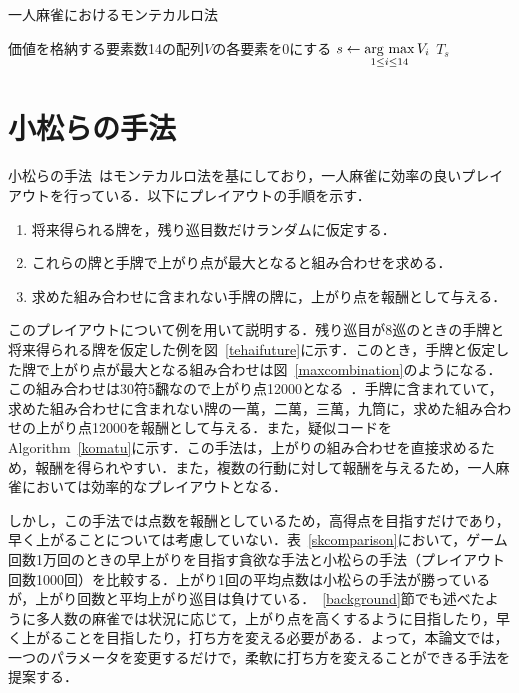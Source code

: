 \begin{algorithm}[t]
\caption{一人麻雀におけるモンテカルロ法}
\label{majangmonte}
	価値を格納する要素数14の配列$V$の各要素を0にする\;
	$s \leftarrow \mathop{\rm arg~max}\limits_{1 \le i \le 14} V_i$\;
	\Return $T_s$\;
\end{algorithm}
\clearpage

\section{小松らの手法}
小松らの手法~\cite{komatu}はモンテカルロ法を基にしており，一人麻雀に効率の良いプレイアウトを行っている．以下にプレイアウトの手順を示す．
\begin{enumerate}
\item 将来得られる牌を，残り巡目数だけランダムに仮定する．
\item これらの牌と手牌で上がり点が最大となると組み合わせを求める．
\item 求めた組み合わせに含まれない手牌の牌に，上がり点を報酬として与える．
\end{enumerate}
このプレイアウトについて例を用いて説明する．残り巡目が8巡のときの手牌と将来得られる牌を仮定した例を図~\ref{tehaifuture}に示す．このとき，手牌と仮定した牌で上がり点が最大となる組み合わせは図~\ref{maxcombination}のようになる．この組み合わせは30符5飜なので上がり点12000となる~\cite{point}．手牌に含まれていて，求めた組み合わせに含まれない牌の一萬，二萬，三萬，九筒に，求めた組み合わせの上がり点12000を報酬として与える．また，疑似コードをAlgorithm~\ref{komatu}に示す．この手法は，上がりの組み合わせを直接求めるため，報酬を得られやすい．また，複数の行動に対して報酬を与えるため，一人麻雀においては効率的なプレイアウトとなる．

しかし，この手法では点数を報酬としているため，高得点を目指すだけであり，早く上がることについては考慮していない．表~\ref{skcomparison}において，ゲーム回数1万回のときの早上がりを目指す貪欲な手法と小松らの手法（プレイアウト回数1000回）を比較する．上がり1回の平均点数は小松らの手法が勝っているが，上がり回数と平均上がり巡目は負けている．~\ref{background}節でも述べたように多人数の麻雀では状況に応じて，上がり点を高くするように目指したり，早く上がることを目指したり，打ち方を変える必要がある．よって，本論文では，一つのパラメータを変更するだけで，柔軟に打ち方を変えることができる手法を提案する．

